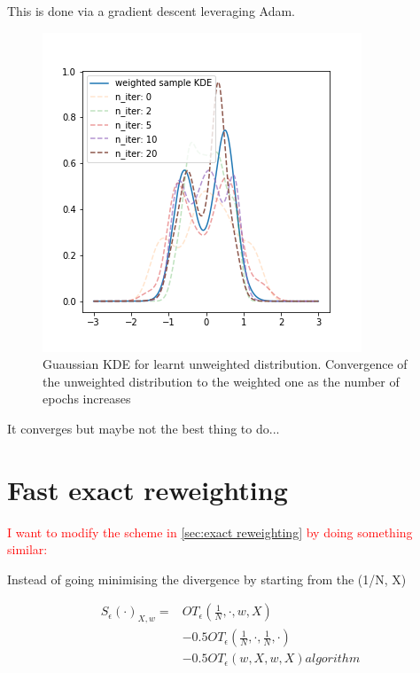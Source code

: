 \documentclass[%
reprint,
amsmath,amssymb,
aps,
]{revtex4-2}
\newcommand\todo[1]{\textcolor{red}{#1}}
\begin{document}
		This is done via a gradient descent leveraging Adam.
		
		\begin{figure}
			\includegraphics[width=\linewidth]{LearntDist}
			\caption{
				Guaussian KDE for learnt unweighted distribution.
				Convergence of the unweighted distribution to the weighted one as the number of epochs increases
				}
			\label{fig:learntResampling}
		\end{figure}	
		
		It converges but maybe not the best thing to do...
		
		
	\section{Fast exact reweighting}
	\label{sec:fast reweighting}
		\todo{I want to modify the scheme in \cref{sec:exact reweighting} by doing something similar:}
		
		Instead of going minimising the divergence by starting from the (1/N, X)
		
		\begin{align*} 
			S_\epsilon(\cdot)_{X, w} 
			=& OT_{\epsilon}\left(\frac 1 N, \cdot, w, X\right) \\
			&- 0.5 OT_\epsilon\left(\frac 1 N, \cdot, \frac 1 N, \cdot \right) \\ 
			&- 0.5 OT_\epsilon(w, X, w, X)algorithm
		\end{align*}
		
\end{document}
